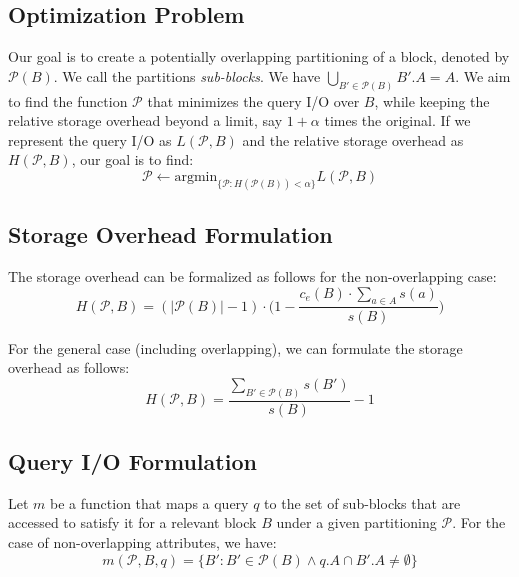 \subsection{Optimization Problem}
Our goal is to create a potentially overlapping partitioning of a block,
denoted by $\mathcal{P}(B)$. We call the partitions \emph{sub-blocks}. We have
$\bigcup_{B'\in \mathcal{P}(B)} B'.A = A$. We aim to find the function
$\mathcal{P}$ that minimizes the query I/O over $B$, while keeping the
relative storage overhead beyond a limit, say $1+\alpha$ times the original.
If we represent the query I/O as $L(\mathcal{P}, B)$ and the relative storage
overhead as $H(\mathcal{P}, B)$, our goal is to find:
\begin{equation}
\mathcal{P} \leftarrow \mbox{argmin}_{\{\mathcal{P}: H(\mathcal{P}(B)) < \alpha\}} L(\mathcal{P},B)
\end{equation}

\subsection{Storage Overhead Formulation}
The storage overhead can be formalized as follows for the non-overlapping case:
\begin{equation}
H(\mathcal{P}, B) = (|\mathcal{P}(B)|-1)\cdot\Big(1-\frac{c_e(B)\cdot \sum_{a\in A} s(a)}{s(B)}\Big) 
\end{equation}

For the general case (including overlapping), we can formulate the storage
overhead as follows:
\begin{equation}
H(\mathcal{P}, B) = \frac{\sum_{B'\in \mathcal{P}(B)} s(B')}{s(B)} - 1 
\end{equation}

\subsection{Query I/O Formulation}
Let $m$ be a function that maps a query $q$ to the set of sub-blocks that are
accessed to satisfy it for a relevant block $B$ under a given partitioning
$\mathcal{P}$. For the case of non-overlapping attributes, we have:
\begin{equation}
m(\mathcal{P}, B, q) = \{B': B'\in \mathcal{P}(B) \wedge q.A \cap B'.A \ne \emptyset\}  
\end{equation}

